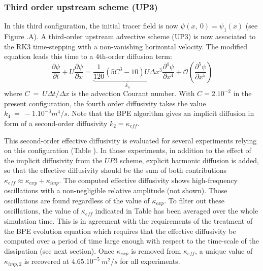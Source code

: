 \subsubsection{Third order upstream scheme (UP3)}
In this third configuration, the initial tracer field is now $\psi(x,\ 0)=\psi_1(x)$ (see Figure .A).
A third-order upstream advective scheme (UP3) is now associated to the RK3 time-stepping with a non-vanishing horizontal velocity. The modified equation leads this time to a 4th-order diffusion term:
\begin{equation}
\frac{\partial \psi}{\partial t}+U \frac{\partial \psi}{\partial x} = \underbrace{\frac{1}{120}(5 C^3-10) U \Delta x^3}_{k_4}  \frac{\partial^4 \psi}{\partial x^4} + \mathcal{O}(\frac{\partial^5 \psi}{\partial x^5})
\end{equation}
where $C\ =\ U\Delta t/\Delta x$ is the advection Courant number. With $C=2 . 10^{-2}$ in the present configuration, the fourth order diffusivity takes the value $k_4\ =\ -1.10^{-3} m^4/s$. Note that the BPE algorithm gives an implicit diffusion in form of a second-order diffusivity $k_2=\kappa_{eff}$.

This second-order effective diffusivity is evaluated for several experiments relying on this configuration (Table ). In those experiments, in addition to the effect of the implicit diffusivity from the $UP3$ scheme, explicit harmonic diffusion is added, so that the effective diffusivity should be the sum of both contributions $\kappa_{eff} \approx \kappa_{exp} + \kappa_{imp}$.
The computed effective diffusivity shows high-frequency oscillations with a non-negligible relative amplitude (not shown). Those oscillations are found regardless of the value of $\kappa_{exp}$. To filter out these oscillations, the value of $\kappa_{eff}$ indicated in Table  has been averaged over the whole simulation time. This is in agreement with the requirements of the treatment of the BPE evolution equation  which requires that the effective diffusivity be computed over a period of time large enough with respect to the time-scale of the dissipation (see next section).
Once $\kappa_{exp}$ is removed from $\kappa_{eff}$, a unique value of $\kappa_{imp,2}$ is recovered at $4.65.10^{-5}\ m^2/s$ for all experiments.


